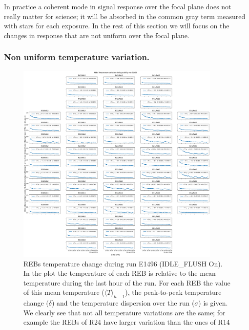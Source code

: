 In practice a coherent mode in signal response over the focal plane does not really matter for science; it will be absorbed in the common gray term measured with stars for each exposure. In the rest of this section we will focus on the changes in response that are not uniform over the focal plane.

\subsubsection{Non uniform temperature variation.}

\begin{figure}[ht]
\begin{centering}
\includegraphics[width=0.9\textwidth]{figures/FocalPlanTempRun_E1496.png}
\end{centering}
\caption{REBs temperature change during run E1496 (IDLE\_FLUSH On). In the plot the temperature of each REB is relative to the mean temperature during the last hour of the run. For each REB the value of this mean temperature ($\langle T \rangle_{h-1}$), the peak-to-peak temperature change ($\delta$) and the temperature dispersion over the run ($\sigma$) is given. We clearly see that not all temperature variations are the same; for example the REBs of R24 have larger variation than the ones of R14}
\label{fig:tempE1496}
\end{figure}
